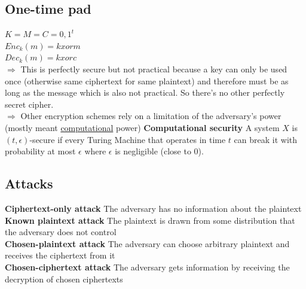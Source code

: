 \documentclass[12pt]{article}
\begin{document}
	\subsection{One-time pad}
	$K = M = C = {0,1}^t$\\
	$Enc_k(m) = k xor m$\\
	$Dec_k(m) = k xor c$\\
	$\Rightarrow$ This is perfectly secure but not practical because a key can only be used once (otherwise same ciphertext for same plaintext) and therefore must be as long as the message which is also not practical. So there's no other perfectly secret cipher.\\
	$\Rightarrow$ Other encryption schemes rely on a limitation of the adversary's power (mostly meant \underline{computational} power)
	\textbf{Computational security} A system $X$ is $(t,\epsilon)$-secure if every Turing Machine that operates in time $t$ can break it with probability at most $\epsilon$ where $\epsilon$ is negligible (close to 0).
	
	\subsection{Attacks}
	\textbf{Ciphertext-only attack} The adversary has no information about the plaintext\\
	\textbf{Known plaintext attack} The plaintext is drawn from some distribution that the adversary does not control\\
	\textbf{Chosen-plaintext attack} The adversary can choose arbitrary plaintext and receives the ciphertext from it\\
	\textbf{Chosen-ciphertext attack} The adversary gets information by receiving the decryption of chosen ciphertexts
	
\end{document}
